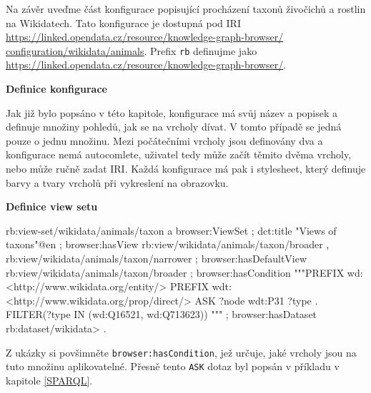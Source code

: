 \begin{prikl}
Na závěr uveďme část konfigurace popisující procházení taxonů živočichů a rostlin na Wikidatech. Tato konfigurace je dostupná pod IRI \\\href{https://linked.opendata.cz/resource/knowledge-graph-browser/configuration/wikidata/animals}{https://linked.opendata.cz/resource/knowledge-graph-browser/}\\\href{https://linked.opendata.cz/resource/knowledge-graph-browser/configuration/wikidata/animals}{configuration/wikidata/animals}. Prefix \texttt{rb} definujme jako \\\url{https://linked.opendata.cz/resource/knowledge-graph-browser/}.

\smallskip

\textbf{Definice konfigurace}
Jak již bylo popsáno v této kapitole, konfigurace má svůj název a popisek a definuje množiny pohledů, jak se na vrcholy dívat. V tomto případě se jedná pouze o jednu množinu. Mezi počátečními vrcholy jsou definovány dva a konfigurace nemá autocomlete, uživatel tedy může začít těmito dvěma vrcholy, nebo může ručně zadat IRI. Každá konfigurace má pak i stylesheet, který definuje barvy a tvary vrcholů při vykreslení na obrazovku.

\newpage

\textbf{Definice view setu}
\begin{code}
rb:view-set/wikidata/animals/taxon a browser:ViewSet ;
    dct:title "Views of taxons"@en ;
    browser:hasView rb:view/wikidata/animals/taxon/broader ,
                    rb:view/wikidata/animals/taxon/narrower ;
    browser:hasDefaultView rb:view/wikidata/animals/taxon/broader ;
    browser:hasCondition
        """PREFIX wd: <http://www.wikidata.org/entity/>
PREFIX wdt: <http://www.wikidata.org/prop/direct/>
ASK {
  ?node wdt:P31 ?type .
  FILTER(?type IN (wd:Q16521, wd:Q713623))
}""" ;
    browser:hasDataset rb:dataset/wikidata> .
\end{code}
Z ukázky si povšimněte \texttt{browser:hasCondition}, jež určuje, jaké vrcholy jsou na tuto množinu aplikovatelné. Přesně tento \texttt{ASK} dotaz byl popsán v příkladu v kapitole \ref{SPARQL}.


\end{prikl}
